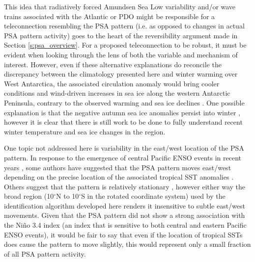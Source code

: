 This idea that radiatively forced Amundsen Sea Low variability and/or wave trains associated with the Atlantic or PDO might be responsible for a teleconnection resembling the PSA pattern (i.e. as opposed to changes in actual PSA pattern activity) goes to the heart of the reversibility argument made in Section \ref{s:psa_overview}. For a proposed teleconnection to be robust, it must be evident when looking through the lens of both the variable and mechanism of interest. However, even if these alternative explanations do reconcile the discrepancy between the climatology presented here and winter warming over West Antarctica, the associated circulation anomaly would bring cooler conditions and wind-driven increases in sea ice along the western Antarctic Peninsula, contrary to the observed warming and sea ice declines \citep{Clem2015}. One possible explanation is that the negative autumn sea ice anomalies persist into winter \citep{Ding2013}, however it is clear that there is still work to be done to fully understand recent winter temperature and sea ice changes in the region.

One topic not addressed here is variability in the east/west location of the PSA pattern. In response to the emergence of central Pacific ENSO events in recent years \citep[e.g.][]{Ashok2007}, some authors have suggested that the PSA pattern moves east/west depending on the precise location of the associated tropical SST anomalies \citep[e.g.][]{Sun2013,Wilson2014,Ciasto2015}. Others suggest that the pattern is relatively stationary \citep[e.g.][]{Liu2007,Ding2012}, however either way the broad region (10$^{\circ}$N to 10$^{\circ}$S in the rotated coordinate system) used by the identification algorithm developed here renders it insensitive to subtle east/west movements. Given that the PSA pattern did not show a strong association with the Ni\~{n}o 3.4 index (an index that is sensitive to both central and eastern Pacific ENSO events), it would be fair to say that even if the location of tropical SSTs does cause the pattern to move slightly, this would represent only a small fraction of all PSA pattern activity. 

